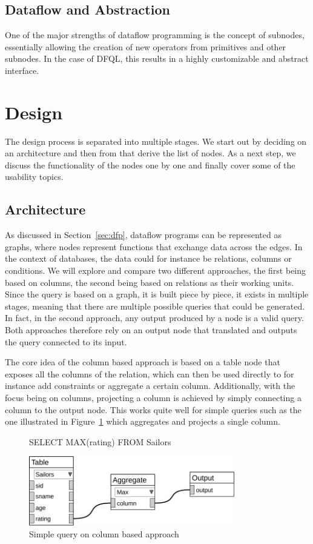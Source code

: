 \documentclass[11pt,a4paper]{globis-book}
\begin{document}
\subsection{Dataflow and Abstraction}
One of the major strengths of dataflow programming is the concept of subnodes, essentially allowing the creation of new operators from primitives and other subnodes. In the case of DFQL, this results in a highly customizable and abstract interface.

\section{Design}
\label{sec:design}
The design process is separated into multiple stages. We start out by deciding on an architecture and then from that derive the list of nodes. As a next step, we discuss the functionality of the nodes one by one and finally cover some of the usability topics.

\subsection{Architecture}
\label{sec:arch}
As discussed in Section~\ref{sec:dfp}, dataflow programs can be represented as graphs, where nodes represent functions that exchange data across the edges. In the context of databases, the data could for instance be relations, columns or conditions. We will explore and compare two different approaches, the first being based on columns, the second being based on relations as their working units. Since the query is based on a graph, it is built piece by piece, it exists in multiple stages, meaning that there are multiple possible queries that could be generated. In fact, in the second approach, any output produced by a node is a valid query. Both approaches therefore rely on an output node that translated and outputs the query connected to its input.

The core idea of the column based approach is based on a table node that exposes all the columns of the relation, which can then be used directly to for instance add constraints or aggregate a certain column. Additionally, with the focus being on columns, projecting a column is achieved by simply connecting a column to the output node. This works quite well for simple queries such as the one illustrated in Figure~\ref{fig:col_agg} which aggregates and projects a single column.

\begin{figure}[h]
\begin{codeex}
SELECT MAX(rating)
FROM Sailors
\end{codeex}

  \centering
  \includegraphics[width=0.8\textwidth]{resources/ColAgg.pdf}
  \caption{Simple query on column based approach}
  \label{fig:col_agg}
\end{figure}
\end{document}
